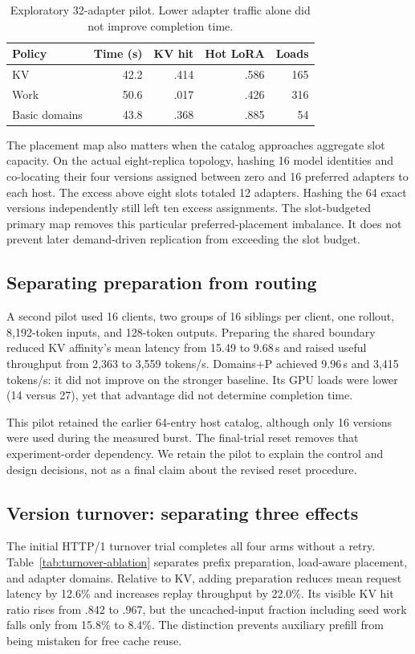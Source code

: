 \begin{table}[t]
\centering\small
\begin{tabular}{lrrrr}
\toprule
Policy & Time (s) & KV hit & Hot LoRA & Loads\\
\midrule
KV & 42.2 & .414 & .586 & 165\\
Work & 50.6 & .017 & .426 & 316\\
Basic domains & 43.8 & .368 & .885 & 54\\
\bottomrule
\end{tabular}
\caption{Exploratory 32-adapter pilot. Lower adapter traffic alone did not
improve completion time.}\label{tab:pilot}
\end{table}

The placement map also matters when the catalog approaches aggregate slot
capacity. On the actual eight-replica topology, hashing 16 model identities and
co-locating their four versions assigned between zero and 16 preferred adapters
to each host. The excess above eight slots totaled 12 adapters. Hashing the 64
exact versions independently still left ten excess assignments. The
slot-budgeted primary map removes this particular preferred-placement
imbalance. It does not prevent later demand-driven replication from exceeding
the slot budget.

\subsection{Separating preparation from routing}
A second pilot used 16 clients, two groups of 16 siblings per client, one
rollout, 8,192-token inputs, and 128-token outputs. Preparing the shared boundary
reduced KV affinity's mean latency from 15.49 to 9.68\,s and raised useful
throughput from 2,363 to 3,559 tokens/s. Domains+P achieved 9.96\,s and 3,415
tokens/s: it did not improve on the stronger baseline. Its GPU loads were lower
(14 versus 27), yet that advantage did not determine completion time.

This pilot retained the earlier 64-entry host catalog, although only 16 versions
were used during the measured burst. The final-trial reset removes that
experiment-order dependency. We retain the pilot to explain the control and
design decisions, not as a final claim about the revised reset procedure.

\subsection{Version turnover: separating three effects}
The initial HTTP/1 turnover trial completes all four arms without a retry.
Table~\ref{tab:turnover-ablation} separates prefix preparation, load-aware
placement, and adapter domains. Relative to KV, adding preparation reduces mean
request latency by 12.6\% and increases replay throughput by 22.0\%. Its visible
KV hit ratio rises from .842 to .967, but the uncached-input fraction including
seed work falls only from 15.8\% to 8.4\%. The distinction prevents auxiliary
prefill from being mistaken for free cache reuse.

